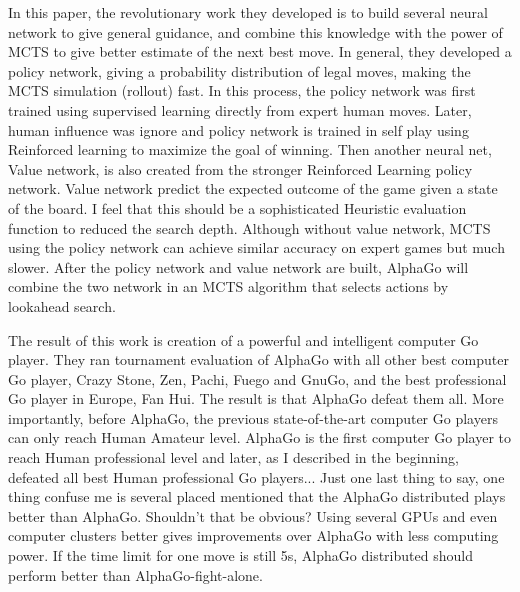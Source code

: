 \documentclass[11pt, letterpaper]{article}
\begin{document}
In this paper, the revolutionary work they developed is to build several neural network to give general guidance, and combine this knowledge with the power of MCTS to give better estimate of the next best move. In general, they developed a policy network, giving a probability distribution of legal moves, making the MCTS simulation (rollout) fast. In this process, the policy network was first trained using supervised learning directly from expert human moves. Later, human influence was ignore and policy network is trained in self play using Reinforced learning to maximize the goal of winning. Then another neural net, Value network, is also created from the stronger Reinforced Learning policy network. Value network predict the expected outcome of the game given a state of the board. I feel that this should be a sophisticated Heuristic evaluation function to reduced the search depth. Although without value network, MCTS using the policy network can achieve similar accuracy on expert games but much slower. After the policy network and value network are built, AlphaGo will combine the two network in an MCTS algorithm that selects actions by lookahead search.

The result of this work is creation of a powerful and intelligent computer Go player. They ran tournament evaluation of AlphaGo with all other best computer Go player, Crazy Stone, Zen, Pachi, Fuego and GnuGo, and the best professional Go player in Europe, Fan Hui. The result is that AlphaGo defeat them all. More importantly, before AlphaGo, the previous state-of-the-art computer Go players can only reach Human Amateur level. AlphaGo is the first computer Go player to reach Human professional level and later, as I described in the beginning, defeated all best Human professional Go players... Just one last thing to say, one thing confuse me is several placed mentioned that the AlphaGo distributed plays better than AlphaGo. Shouldn't that be obvious? Using several GPUs and even computer clusters better gives improvements over AlphaGo with less computing power. If the time limit for one move is still 5s, AlphaGo distributed should perform better than AlphaGo-fight-alone. 
\end{document}
